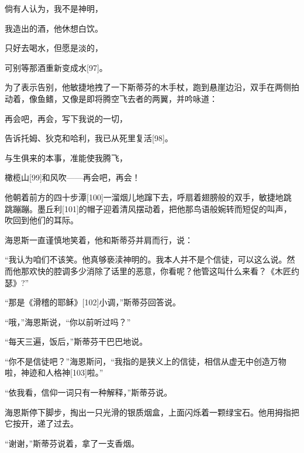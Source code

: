 \documentclass{article}
\begin{document}
倘有人认为，我不是神明，



我造出的酒，他休想白饮。



只好去喝水，但愿是淡的，



可别等那酒重新变成水[97]。



为了表示告别，他敏捷地拽了一下斯蒂芬的木手杖，跑到悬崖边沿，双手在两侧拍动着，像鱼鳍，又像是即将腾空飞去者的两翼，并吟咏道：



再会吧，再会，写下我说的一切，



告诉托姆、狄克和哈利，我已从死里复活[98]。



与生俱来的本事，准能使我腾飞，



橄榄山[99]和风吹——再会吧，再会！



他朝着前方的四十步潭[100]一溜烟儿地蹿下去，呼扇着翅膀般的双手，敏捷地跳跳蹦蹦。墨丘利[101]的帽子迎着清风摆动着，把他那鸟语般婉转而短促的叫声，吹回到他们的耳际。



海恩斯一直谨慎地笑着，他和斯蒂芬并肩而行，说：



“我认为咱们不该笑。他真够亵渎神明的。我本人并不是个信徒，可以这么说。然而他那欢快的腔调多少消除了话里的恶意，你看呢？他管这叫什么来看？《木匠约瑟》?”



“那是《滑稽的耶稣》[102]小调，”斯蒂芬回答说。



“哦，”海恩斯说，“你以前听过吗？”



“每天三遍，饭后，”斯蒂芬干巴巴地说。



“你不是信徒吧？”海恩斯问，“我指的是狭义上的信徒，相信从虚无中创造万物啦，神迹和人格神[103]啦。”



“依我看，信仰一词只有一种解释，”斯蒂芬说。



海恩斯停下脚步，掏出一只光滑的银质烟盒，上面闪烁着一颗绿宝石。他用拇指把它按开，递了过去。



“谢谢，”斯蒂芬说着，拿了一支香烟。
\end{document}
